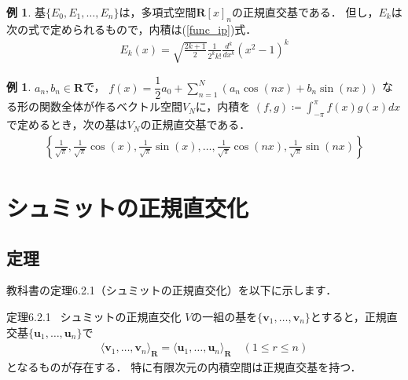 \documentclass[dvipdfmx]{jsarticle}
\theoremstyle{definition}
\newtheorem{example}[definition]{例}
\begin{document}
\begin{example}
    \label{ex_polspaceno}
    基$\{ E_0, E_1, \ldots, E_n \}$は，多項式空間$\bm{R}[x]_n$の正規直交基である．
    但し，$E_k$は次の式で定められるもので，内積は(\ref{func_ip})式．
    \begin{align*}
        E_k(x) = \sqrt{\frac{2k+1}{2}} \frac{1}{2^k k!} \frac{d^k}{dx^k} (x^2 - 1)^k
    \end{align*}
\end{example}

\vspace{\baselineskip}

\begin{example}
    $a_n, b_n \in \bm{R}$で，
    $f(x) = \dfrac{1}{2} a_0 + {\displaystyle \sum_{n=1}^N} (a_n \cos(nx) + b_n \sin(nx))$
    なる形の関数全体が作るベクトル空間$V_N$に，内積を
    $(f, g) \coloneqq {\displaystyle \int_{-\pi}^{\pi}} f(x) g(x) dx$
    で定めるとき，次の基は$V_N$の正規直交基である．
    \begin{align*}
        \left\{
            \frac{1}{\sqrt{\pi}},
            \frac{1}{\sqrt{\pi}} \cos(x),
            \frac{1}{\sqrt{\pi}} \sin(x),
            \ldots,
            \frac{1}{\sqrt{\pi}} \cos(nx),
            \frac{1}{\sqrt{\pi}} \sin(nx)
        \right\}
    \end{align*}
\end{example}


\section{シュミットの正規直交化}

\subsection{定理}
教科書の定理6.2.1（シュミットの正規直交化）を以下に示します．

\begin{itembox}[l]{定理6.2.1 \ シュミットの正規直交化}
$V$の一組の基を$\{\bm{v}_1, \ldots, \bm{v}_n\}$とすると，正規直交基$\{\bm{u}_1, \ldots, \bm{u}_n\}$で
\begin{align*}
    \langle \bm{v}_1, \ldots, \bm{v}_n \rangle_{\bm{R}} = \langle \bm{u}_1, \ldots, \bm{u}_n \rangle_{\bm{R}} \quad (1 \leq r \leq n)
\end{align*}
となるものが存在する．
特に有限次元の内積空間は正規直交基を持つ．
\end{itembox}
\end{document}
